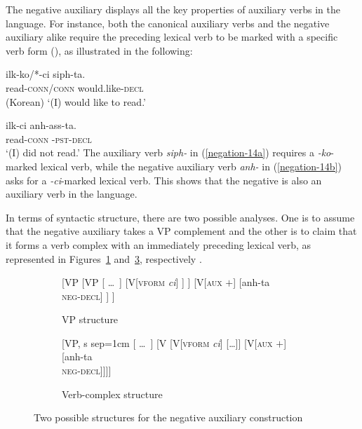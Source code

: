 \documentclass[output=paper
 	        ,biblatex
                ,babelshorthands
                ,newtxmath
                ,draftmode
                ,colorlinks, citecolor=brown
]{langscibook}
\begin{document}
\begin{exe}
\begin{xlist}
\begin{exe}
\begin{xlist}
The  negative auxiliary displays all the key properties of auxiliary verbs in the
language. For instance, both the canonical auxiliary verbs and the negative auxiliary alike require
the preceding lexical verb to be marked with a specific verb form (\vform), as illustrated in the
following:

\eal
\ex\label{negation-14a}
\gll ilk-ko/*-ci siph-ta. \\
     read-\textsc{conn}/\textsc{conn} would.like-\textsc{decl} \\\hfill(Korean)
\glt `(I) would like to read.'

\ex\label{negation-14b}
\gll ilk-ci anh-ass-ta. \\
     read-\textsc{conn} \NEG-\textsc{pst}-\textsc{decl} \\
\glt `(I) did not read.'
\zl
\noindent
The auxiliary verb \textit{siph-} in (\ref{negation-14a}) requires a
\textit{-ko}-marked lexical verb, while the negative auxiliary
 verb \textit{anh-} in (\ref{negation-14b}) asks for a \textit{-ci}-marked lexical
 verb. This shows that the negative is also an auxiliary verb in the language.

In terms of syntactic structure, there
are two possible analyses.  One is to assume that the negative auxiliary takes a VP complement and the other is to claim that it forms a verb complex with
an immediately preceding lexical verb, as represented in Figures~\ref{negation-fig:3a} and~\ref{negation-fig:3b}, respectively
\citep{Chung98a-u, Kim:16}.
\begin{figure}
	\begin{subfigure}[b]{0.48\textwidth}
\centering
		\begin{forest}
			[VP
				[VP
					[ \dots\ ]
					[V{[\textsc{vform} \textit{ci}]}
					]
					]
				[V{[\textsc{aux $+$}]}
					[anh-ta\\ \textsc{neg-decl}]
				]
			]	
		\end{forest}
	\caption{VP structure}\label{negation-fig:3a}
		\end{subfigure}	
\hfill
	\begin{subfigure}[b]{0.48\textwidth}
\centering
		\begin{forest}
			[VP, s sep=1cm
				[ \dots\ ]
				[V
					[V{[\textsc{vform} \textit{ci}]}
						[\dots]]
					[V{[\textsc{aux $+$}]}
						[anh-ta\\ \textsc{neg-decl}]]]]
		\end{forest}
	\caption{Verb-complex structure}\label{negation-fig:3b}	
		\end{subfigure}
	\caption{Two possible structures for the negative auxiliary construction}
\end{figure}


\end{xlist}
\end{exe}
\end{xlist}
\end{exe}
\end{document}
